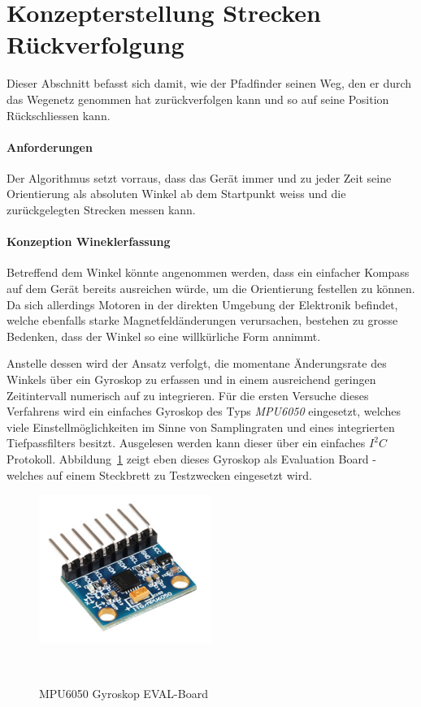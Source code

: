\documentclass[main.tex]{subfiles} %
\begin{document}

\section{Konzepterstellung Strecken Rückverfolgung}

Dieser Abschnitt befasst sich damit, wie der Pfadfinder seinen Weg, den er
durch das Wegenetz genommen hat zurückverfolgen kann und so auf seine Position
Rückschliessen kann.

\paragraph{Anforderungen}
Der Algorithmus setzt vorraus, dass das Gerät immer und zu jeder Zeit seine
Orientierung als absoluten Winkel ab dem Startpunkt weiss und die
zurückgelegten Strecken messen kann.

\paragraph{Konzeption Wineklerfassung}
Betreffend dem Winkel könnte angenommen werden, dass ein einfacher Kompass auf
dem Gerät bereits ausreichen würde, um die Orientierung festellen zu können. Da
sich allerdings Motoren in der direkten Umgebung der Elektronik befindet,
welche ebenfalls starke Magnetfeldänderungen verursachen, bestehen zu grosse
Bedenken, dass der Winkel so eine willkürliche Form annimmt.

Anstelle dessen wird der Ansatz verfolgt, die momentane Änderungsrate des
Winkels über ein Gyroskop zu erfassen und in einem ausreichend geringen
Zeitintervall numerisch auf zu integrieren. Für die ersten Versuche dieses
Verfahrens wird ein einfaches Gyroskop des Typs \textit{MPU6050} eingesetzt,
welches viele Einstellmöglichkeiten im Sinne von Samplingraten und eines
integrierten Tiefpassfilters besitzt. Ausgelesen werden kann dieser über ein
einfaches $I^2C$ Protokoll. Abbildung~\ref{fig:MPU6050} zeigt eben dieses
Gyroskop als Evaluation Board - welches auf einem Steckbrett zu Testzwecken
eingesetzt wird.

\begin{figure}[h!]
    \centering
    \includegraphics[width=0.5\textwidth]{./fig_Strecken_Tracken/MPU6050.png}
    \caption{MPU6050 Gyroskop EVAL-Board}~\label{fig:MPU6050}
\end{figure}
\end{document}
